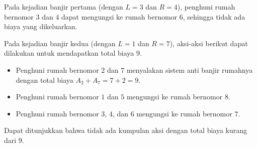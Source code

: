 \documentclass{article}
\begin{document}
Pada kejadian banjir pertama (dengan $L=3$ dan $R=4$), penghuni rumah bernomor $3$ dan $4$ dapat mengungsi ke rumah bernomor $6$, sehingga tidak ada biaya yang dikeluarkan.

Pada kejadian banjir kedua (dengan $L=1$ dan $R=7$), aksi-aksi berikut dapat dilakukan untuk mendapatkan total biaya $9$.
\begin{itemize}
    \item Penghuni rumah bernomor $2$ dan $7$ menyalakan sistem anti banjir rumahnya dengan total biaya $A_2+A_7 = 7+2 = 9$.
    \item Penghuni rumah bernomor $1$ dan $5$ mengungsi ke rumah bernomor $8$.
    \item Penghuni rumah bernomor $3$, $4$, dan $6$ mengungsi ke rumah bernomor $7$.
\end{itemize}
Dapat ditunjukkan bahwa tidak ada kumpulan aksi dengan total biaya kurang dari $9$.
\end{document}
